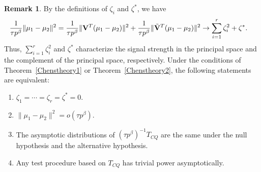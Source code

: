\documentclass[review]{elsarticle}
\theoremstyle{plain}
\newtheorem{theorem}{\quad\quad Theorem}
\theoremstyle{definition}
\newtheorem{remark}{\quad\quad Remark}
\theoremstyle{remark}
\begin{document}
\begin{remark}\label{remark1}
    By the definitions of $\zeta_i$ and $\zeta^*$, we have
    $$
    \begin{aligned}
        &\frac{1}{\tau p^{\beta}}\|\mu_1-\mu_2\|^2
    =
    \frac{1}{\tau p^{\beta}}\|\mathbf{V}^T (\mu_1-\mu_2)\|^2
        +
        \frac{1}{\tau p^{\beta}}\|\tilde{\mathbf{V}}^T (\mu_1-\mu_2)\|^2
    \to \sum_{i=1}^r \zeta_i^2+ \zeta^*.
    \end{aligned}
    $$
    Thus, $\sum_{i=1}^r\zeta_i^2$ and $\zeta^*$ characterize the signal strength in the principal space and the complement of the principal space, respectively.
    Under the conditions of Theorem~\ref{Chenstheory1} or Theorem~\ref{Chenstheory2}, the following statements are equivalent:
    \begin{enumerate}[(1)]
        \item
     $\zeta_1=\cdots=\zeta_r=\zeta^*=0$.
 \item
     $\|\mu_1-\mu_2\|^2=o(\tau p^{\beta})$.
         \item
            The asymptotic distributions of $(\tau p^{\beta})^{-1}T_{CQ}$ are the same under the null hypothesis and the alternative hypothesis.
        \item
            Any test procedure based on $T_{CQ}$ has trivial power asymptotically.
    \end{enumerate}
\end{remark}
\end{document}

